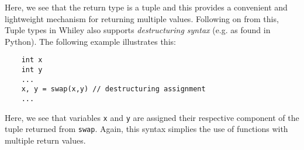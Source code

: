 

Here, we see that the return type is a tuple and this provides a convenient and lightweight mechanism for returning multiple values.  Following on from this, Tuple types in Whiley also supports {\em destructuring syntax} (e.g. as found in Python).  The following example illustrates this:

\begin{lstlisting}
    int x
    int y
    ...
    x, y = swap(x,y) // destructuring assignment
    ...        
\end{lstlisting}

Here, we see that variables \lstinline{x} and \lstinline{y} are assigned their respective component of the tuple returned from \lstinline{swap}.  Again, this syntax simplies the use of functions with multiple return values.
